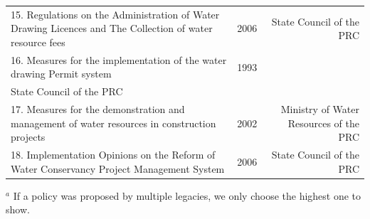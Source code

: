 \documentclass[9pt,twoside,lineno]{pnas-new}
\begin{document}
\begin{table}
\begin{tabular}{lrr}
    15. Regulations on the Administration of Water Drawing Licences and The Collection of water resource fees & 2006 & State Council of the PRC \\
    16. Measures for the implementation of the water drawing Permit system & 1993 \\ State Council of the PRC \\
    17. Measures for the demonstration and management of water resources in construction projects & 2002 & Ministry of Water Resources of the PRC \\
    18. Implementation Opinions on the Reform of Water Conservancy Project Management System & 2006 & State Council of the PRC \\

    \bottomrule
    \end{tabular}

    \footnotesize{$^a$ If a policy was proposed by multiple legacies, we only choose the highest one to show.}
\end{table}


\FloatBarrier




\end{document}
